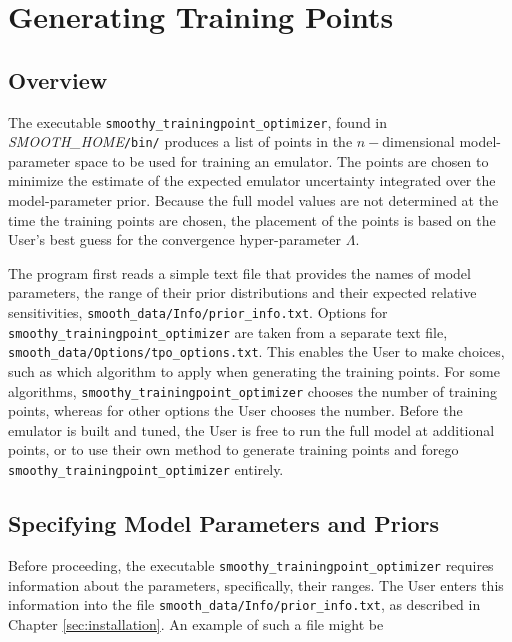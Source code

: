 \documentclass[UserManual.tex]{subfiles}
\begin{document}
\begin{sloppypar}

\section{Generating Training Points}\label{sec:tpo}

\subsection{Overview}
The executable {\tt smoothy\_trainingpoint\_optimizer}, found in \textit{SMOOTH\_HOME}{\tt /bin/} produces a list of points in the $n-$dimensional model-parameter space to be used for training an emulator. The points are chosen to minimize the estimate of the expected emulator uncertainty integrated over the model-parameter prior. Because the full model values are not determined at the time the training points are chosen, the placement of the points is based on the User's best guess for the convergence hyper-parameter $\Lambda$. 

The program first reads a simple text file that provides the names of model parameters, the range of their prior distributions and their expected relative sensitivities, {\tt smooth\_data/Info/prior\_info.txt}. Options for {\tt smoothy\_trainingpoint\_optimizer} are taken from a separate text file, {\tt smooth\_data/Options/tpo\_options.txt}. This enables the User to make choices, such as which algorithm to apply when generating the training points. For some algorithms, {\tt smoothy\_trainingpoint\_optimizer} chooses the number of training points, whereas for other options the User chooses the number. Before the emulator is built and tuned, the User is free to run the full model at additional points, or to use their own method to generate training points and forego {\tt smoothy\_trainingpoint\_optimizer} entirely.

\subsection{Specifying Model Parameters and Priors}\label{subsec:priorinfo}
Before proceeding, the executable {\tt smoothy\_trainingpoint\_optimizer} requires information about the parameters, specifically, their ranges. The User enters this information into the file {\tt smooth\_data/Info/prior\_info.txt}, as described in Chapter \ref{sec:installation}. An example of such a file might be
{\tt\vspace*{-8pt}{\tt \begin{Verbatim}[commandchars=\\\{\}]
# par_name dist_type  xmin/centroid  xmax/Rgauss  SensitivityScale
   parameter_name_0 prior_type_0 xmin_0/centroid_0 xmax_0/width_0 s_0
   parameter_name_1 prior_type_0 xmin_1/centroid_1 xmax_1/width_1 s_1
   .
   parameter_name_n prior_type_n xmin_n/centroid_n xmax_n/width_n s_n


\end{Verbatim}}}
\end{sloppypar}
\end{document}
